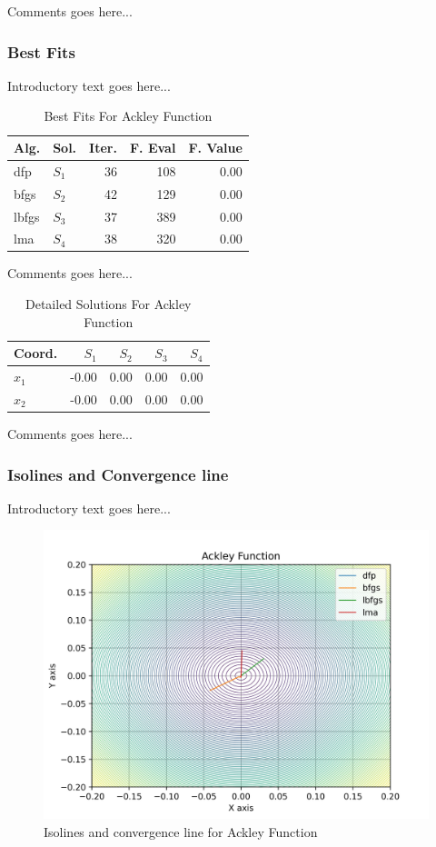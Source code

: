 \documentclass{ieeeaccess}
\begin{document}
Comments goes here...
\subsubsection{Best Fits}
\label{bestfitsackley2D}


Introductory text goes here...
\begin{table}
\centering
\caption{Best Fits For Ackley Function}
\label{solutions:ackley}
\begin{tabular}{llrrr}
\toprule
 Alg. &    Sol. &  Iter. &  F. Eval &  F. Value \\
\midrule
  dfp & $S_{1}$ &     36 &      108 &      0.00 \\
 bfgs & $S_{2}$ &     42 &      129 &      0.00 \\
lbfgs & $S_{3}$ &     37 &      389 &      0.00 \\
  lma & $S_{4}$ &     38 &      320 &      0.00 \\
\bottomrule
\end{tabular}
\end{table}


Comments goes here...
\begin{table}
\centering
\caption{Detailed Solutions For Ackley Function}
\label{detailedsolutions:ackley}
\begin{tabular}{lrrrr}
\toprule
 Coord. &  $S_{1}$ &  $S_{2}$ &  $S_{3}$ &  $S_{4}$ \\
\midrule
$x_{1}$ &    -0.00 &     0.00 &     0.00 &     0.00 \\
$x_{2}$ &    -0.00 &     0.00 &     0.00 &     0.00 \\
\bottomrule
\end{tabular}
\end{table}


Comments goes here...
\subsubsection{Isolines and Convergence line}
\label{isolinesackley2D}


Introductory text goes here...
\begin{figure}[h]
\centering
\includegraphics[scale=0.5]{images/ackley.jpg}
\caption{Isolines and convergence line for Ackley Function}
\label{fig:ackley}
\end{figure}
\end{document}
